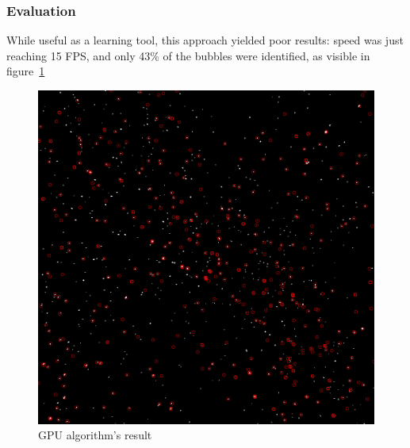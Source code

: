 \subsubsection{Evaluation}

While useful as a learning tool, this approach yielded poor results: speed was just reaching 15 FPS, and only 43\% of the bubbles were identified, as visible in figure~\ref{fig:locate:gpu}

\begin{figure}
	\centerline{\includegraphics[width=\locateimgsize]{images/locate/my-gpu-algorithm.png}}
	\caption{\centering GPU algorithm's result}
	\label{fig:locate:gpu}
\end{figure}
